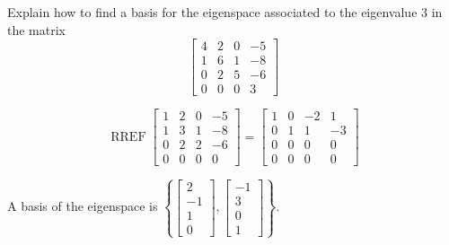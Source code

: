 
\begin{exerciseStatement}


Explain how to find a basis for the eigenspace associated to the eigenvalue \( 3 \) in the matrix \[ \left[\begin{array}{cccc}
4 & 2 & 0 & -5 \\
1 & 6 & 1 & -8 \\
0 & 2 & 5 & -6 \\
0 & 0 & 0 & 3
\end{array}\right] \]


\end{exerciseStatement}
    
\begin{exerciseAnswer} 


\[\operatorname{RREF} \left[\begin{array}{cccc}
1 & 2 & 0 & -5 \\
1 & 3 & 1 & -8 \\
0 & 2 & 2 & -6 \\
0 & 0 & 0 & 0
\end{array}\right] = \left[\begin{array}{cccc}
1 & 0 & -2 & 1 \\
0 & 1 & 1 & -3 \\
0 & 0 & 0 & 0 \\
0 & 0 & 0 & 0
\end{array}\right] \]



A basis of the eigenspace is \( \left\{ \left[\begin{array}{c}
2 \\
-1 \\
1 \\
0
\end{array}\right] , \left[\begin{array}{c}
-1 \\
3 \\
0 \\
1
\end{array}\right] \right\} \).


\end{exerciseAnswer}
    
